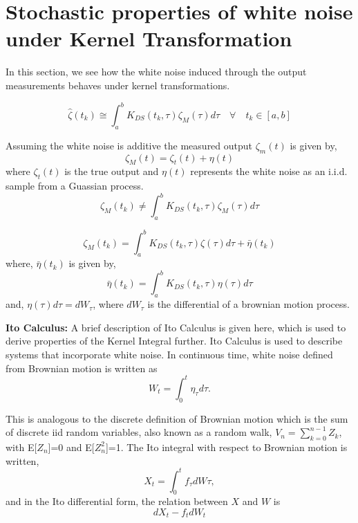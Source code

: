 \documentclass[letterpaper%
, twoside%
, 12pt%
,memoire%
, english%
,creativecommons,hyperref%
]{thETS}
\theoremstyle{newThmStyle}
\begin{document}
\section{Stochastic properties of white noise under Kernel Transformation} \label{Sec:ThmKdo}
In this section, we see how the white noise induced through the output measurements behaves under kernel transformations.

\begin{equation}
	\hat{\zeta}(t_k) \cong \int_a^b K_{DS}(t_k,\tau) \zeta_M(\tau)d\tau
	\quad \forall\quad t_k \in [a,b]
\end{equation}

Assuming the white noise is additive the measured output $\zeta_m(t)$ is given by, 
\begin{equation}
	\zeta_M(t) = \zeta_t(t) + \eta(t)
\end{equation}
where $\zeta_t(t)$ is the true output and $\eta(t)$ represents the white noise as an i.i.d. sample from a Guassian process. 
\begin{equation}
	\zeta_M(t_k) \neq \int_a^b K_{DS}(t_k,\tau) \zeta_M(\tau)d\tau
\end{equation}

\begin{equation}
	\zeta_M(t_k) = \int_a^b K_{DS}(t_k,\tau) \zeta(\tau)d\tau + \bar{\eta}(t_k)
\end{equation}
where, $\bar{\eta}(t_k)$ is given by, 
\begin{equation}
	\label{eq:kernel_noise}
	\bar{\eta}(t_k) = \int_a^b K_{DS}(t_k,\tau) \eta(\tau)d\tau
\end{equation} 
and, $\eta(\tau)d\tau = dW_\tau$, where $dW_\tau$ is the differential of a brownian motion process. 

\textbf{Ito Calculus: }
A brief description of Ito Calculus is given here, which is used to derive properties of the Kernel Integral further. Ito Calculus is used to describe systems that incorporate white noise. In continuous time, white noise defined from Brownian motion is written as 
\begin{equation}
W_t = \int_0^t \eta_\tau d\tau .
\end{equation}

This is analogous to the discrete definition of Brownian motion which is the sum of discrete iid random variables, also known as a random walk, $V_n = \sum_{k=0}^{n-1} Z_k$, with E[$Z_n$]=0 and E[$Z_n^2$]=1. The Ito integral with respect to Brownian motion is written, 
\begin{equation}
X_t = \int_0^t f_\tau dW\tau,
\end{equation} 
and in the Ito differential form, the relation between $X$ and $W$ is 
\begin{equation}
dX_t - f_tdW_t
\end{equation}
\end{document}
